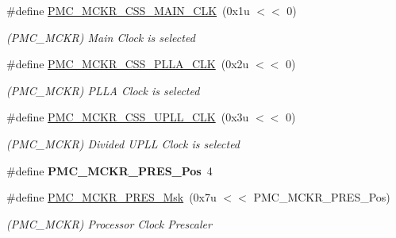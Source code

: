 \begin{DoxyCompactItemize}
\#define \mbox{\hyperlink{group__SAMV71__PMC_ga1083253fbc37fcfcc9aa078dbc35f067}{P\+M\+C\+\_\+\+M\+C\+K\+R\+\_\+\+C\+S\+S\+\_\+\+M\+A\+I\+N\+\_\+\+C\+LK}}~(0x1u $<$$<$ 0)
\begin{DoxyCompactList}\small\item\em (P\+M\+C\+\_\+\+M\+C\+KR) Main Clock is selected \end{DoxyCompactList}\item 
\mbox{\label{group__SAMV71__PMC_ga87abdef35a28f8c1adc1167682ad875f}} 
\#define \mbox{\hyperlink{group__SAMV71__PMC_ga87abdef35a28f8c1adc1167682ad875f}{P\+M\+C\+\_\+\+M\+C\+K\+R\+\_\+\+C\+S\+S\+\_\+\+P\+L\+L\+A\+\_\+\+C\+LK}}~(0x2u $<$$<$ 0)
\begin{DoxyCompactList}\small\item\em (P\+M\+C\+\_\+\+M\+C\+KR) P\+L\+LA Clock is selected \end{DoxyCompactList}\item 
\mbox{\label{group__SAMV71__PMC_ga53f178db8b1b9ca8eaac6e2475ff1ec2}} 
\#define \mbox{\hyperlink{group__SAMV71__PMC_ga53f178db8b1b9ca8eaac6e2475ff1ec2}{P\+M\+C\+\_\+\+M\+C\+K\+R\+\_\+\+C\+S\+S\+\_\+\+U\+P\+L\+L\+\_\+\+C\+LK}}~(0x3u $<$$<$ 0)
\begin{DoxyCompactList}\small\item\em (P\+M\+C\+\_\+\+M\+C\+KR) Divided U\+P\+LL Clock is selected \end{DoxyCompactList}\item 
\mbox{\label{group__SAMV71__PMC_ga28624e80bd61898c81fad61c5f9e5991}} 
\#define {\bfseries P\+M\+C\+\_\+\+M\+C\+K\+R\+\_\+\+P\+R\+E\+S\+\_\+\+Pos}~4
\item 
\mbox{\label{group__SAMV71__PMC_gadc14167dbb6ea635a41df3b41c8b9e84}} 
\#define \mbox{\hyperlink{group__SAMV71__PMC_gadc14167dbb6ea635a41df3b41c8b9e84}{P\+M\+C\+\_\+\+M\+C\+K\+R\+\_\+\+P\+R\+E\+S\+\_\+\+Msk}}~(0x7u $<$$<$ P\+M\+C\+\_\+\+M\+C\+K\+R\+\_\+\+P\+R\+E\+S\+\_\+\+Pos)
\begin{DoxyCompactList}\small\item\em (P\+M\+C\+\_\+\+M\+C\+KR) Processor Clock Prescaler \end{DoxyCompactList}\item 
\mbox{\label{group__SAMV71__PMC_ga53c450e13281ee4db86a15880bf31cb8}} 

\end{DoxyCompactItemize}
